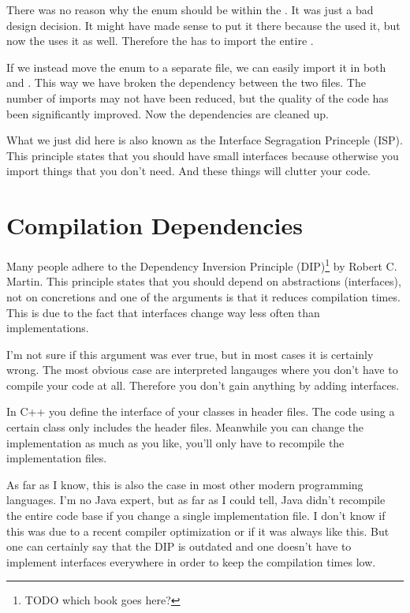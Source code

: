 There was no reason why the  enum should be within the . It was just a bad design decision. It might have made sense to put it there because the  used it, but now the  uses it as well. Therefore the  has to import the entire .

If we instead move the  enum to a separate file, we can easily import it in both  and . This way we have broken the dependency between the two files. The number of imports may not have been reduced, but the quality of the code has been significantly improved. Now the dependencies are cleaned up.

What we just did here is also known as the Interface Segragation Princeple (ISP). This principle states that you should have small interfaces because otherwise you import things that you don't need. And these things will clutter your code.

\section{Compilation Dependencies}

Many people adhere to the Dependency Inversion Principle (DIP)\footnote{TODO which book goes here?} by Robert C. Martin. This principle states that you should depend on abstractions (interfaces), not on concretions and one of the arguments is that it reduces compilation times. This is due to the fact that interfaces change way less often than implementations.

I'm not sure if this argument was ever true, but in most cases it is certainly wrong. The most obvious case are interpreted langauges where you don't have to compile your code at all. Therefore you don't gain anything by adding interfaces.

In C++ you define the interface of your classes in header files. The code using a certain class only includes the header files. Meanwhile you can change the implementation as much as you like, you'll only have to recompile the implementation files.

As far as I know, this is also the case in most other modern programming languages. I'm no Java expert, but as far as I could tell, Java didn't recompile the entire code base if you change a single implementation file. I don't know if this was due to a recent compiler optimization or if it was always like this. But one can certainly say that the DIP is outdated and one doesn't have to implement interfaces everywhere in order to keep the compilation times low.

